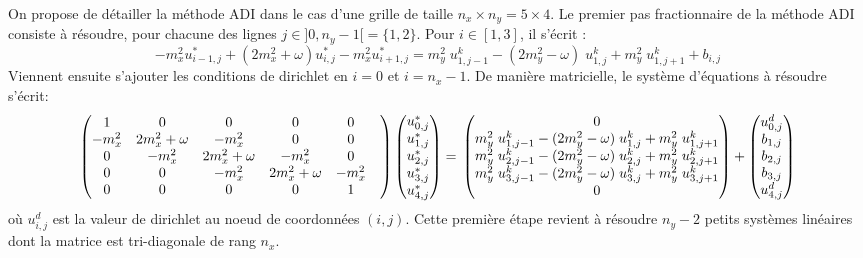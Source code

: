 \documentclass{article}
\begin{document}
On propose de détailler la méthode ADI dans le cas d'une grille de taille $n_x \times n_y = 5 \times 4$. Le premier pas fractionnaire de la méthode ADI consiste à résoudre, pour chacune des lignes $j \in ]0, n_y-1[=\{1, 2\}$. Pour $i \in [1, 3]$, il s'écrit :
\begin{equation}
-m_x^2 u^*_{i-1, j} +(2m_x^2+\omega) u^*_{i, j} -m_x^2 u^*_{i+1, j} =
m_y^2 \; u_{1, j-1}^k - (2m_y^2-\omega)\; u_{1, j}^k +m_y^2 \; u_{1, j+1}^k
+b_{i,j}
\end{equation}
Viennent ensuite s'ajouter les conditions de dirichlet en $i=0$ et $i=n_x-1$.
\noindent
De manière matricielle, le système d'équations à résoudre s'écrit:
\begin{equation}
\begin{pmatrix}
    1 & 0 & 0 & 0 & 0 \\
    -m_x^2 & 2m_x^2+\omega & -m_x^2  & 0 & 0 \\
    0 &  -m_x^2 & 2m_x^2+\omega & -m_x^2  & 0 \\
    0 & 0 &  -m_x^2 & 2m_x^2+\omega & -m_x^2  & \\
    0 & 0 & 0 & 0 & 1
\end{pmatrix}
\begin{pmatrix}
   u^*_{0, j}\\
   u^*_{1, j}\\
   u^*_{2, j}\\
   u^*_{3, j}\\
   u^*_{4, j} \\
\end{pmatrix} = \\
\begin{pmatrix}
   0\\
   m_y^2 \; u_{1, j-1}^k - (2m_y^2-\omega)\; u_{1, j}^k +m_y^2 \; u_{1, j+1}^k \\
   m_y^2 \; u_{2, j-1}^k - (2m_y^2-\omega)\; u_{2, j}^k +m_y^2 \; u_{2, j+1}^k \\
   m_y^2 \; u_{3, j-1}^k - (2m_y^2-\omega)\; u_{3, j}^k +m_y^2 \; u_{3, j+1}^k \\
   0 \\
\end{pmatrix}
+
\begin{pmatrix}
   u^d_{0, j}\\
   b_{1, j}\\
   b_{2, j}\\
   b_{3, j}\\
   u^d_{4, j} \\
\end{pmatrix}
\end{equation}
où $u^d_{i,j}$ est la valeur de dirichlet au noeud de coordonnées $(i,j)$.
Cette première étape revient à résoudre $n_y-2$ petits systèmes linéaires dont la matrice est tri-diagonale de rang $n_x$.
\end{document}
